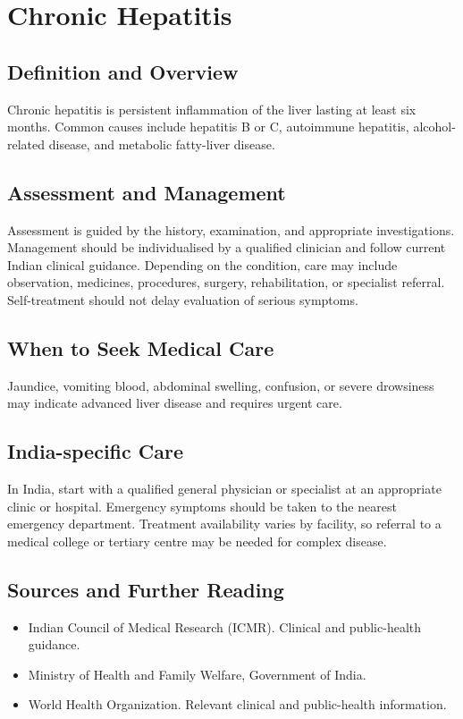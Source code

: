 \chapter{Chronic Hepatitis}

\section*{Definition and Overview}
Chronic hepatitis is persistent inflammation of the liver lasting at least six months. Common causes include hepatitis B or C, autoimmune hepatitis, alcohol-related disease, and metabolic fatty-liver disease.

\section*{Assessment and Management}
Assessment is guided by the history, examination, and appropriate investigations. Management should be individualised by a qualified clinician and follow current Indian clinical guidance. Depending on the condition, care may include observation, medicines, procedures, surgery, rehabilitation, or specialist referral. Self-treatment should not delay evaluation of serious symptoms.

\section*{When to Seek Medical Care}
Jaundice, vomiting blood, abdominal swelling, confusion, or severe drowsiness may indicate advanced liver disease and requires urgent care.

\section*{India-specific Care}
In India, start with a qualified general physician or specialist at an appropriate clinic or hospital. Emergency symptoms should be taken to the nearest emergency department. Treatment availability varies by facility, so referral to a medical college or tertiary centre may be needed for complex disease.

\section*{Sources and Further Reading}
\begin{itemize}
    \item Indian Council of Medical Research (ICMR). Clinical and public-health guidance.
    \item Ministry of Health and Family Welfare, Government of India.
    \item World Health Organization. Relevant clinical and public-health information.
\end{itemize}

